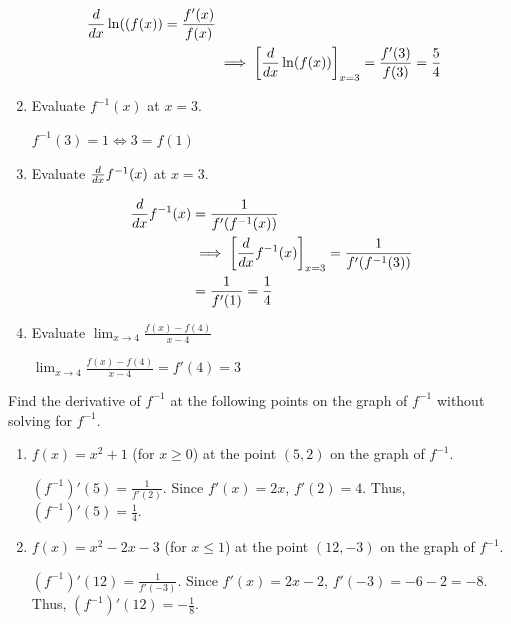 \documentclass[nooutcomes]{ximera}
\begin{document}
\begin{problem}
\begin{enumerate}
\begin{freeResponse}
        \begin{align*}
          \frac{d}{dx}\ln((f(x)) = \frac{f'(x)}{f(x)} \\
          &\implies \bigg[ \frac{d}{dx} \ln(f(x)) \bigg]_{x = 3} = \frac{f'(3)}{f(3)} = \frac{5}{4}
        \end{align*}
      \end{freeResponse}


    \item Evaluate $f^{-1}(x)$ at $x = 3$.
      \begin{freeResponse}
	$ f^{-1}(3) = 1 \iff 3 = f(1)$
      \end{freeResponse}


    \item Evaluate $\frac{d}{dx} f^{-1}(x)$ at $x = 3$.
      \begin{freeResponse}
        \begin{align*}
          \frac{d}{dx} f^{-1}(x) &= \frac{1}{f'(f^{-1}(x))} \\
          &\implies \bigg[ \frac{d}{dx} f^{-1}(x) \bigg]_{x = 3} = \frac{1}{f'(f^{-1}(3))} \\
          &= \frac{1}{f'(1)} = \frac{1}{4}
        \end{align*}
      \end{freeResponse}
      
      \item Evaluate $\lim_{x \to 4} \frac{f(x)-f(4)}{x-4}$
      \begin{freeResponse}
$\lim_{x \to 4} \frac{f(x)-f(4)}{x-4} = f'(4)=3$
      \end{freeResponse}
  \end{enumerate}
\end{problem}


\begin{problem}
Find the derivative of $f^{-1}$ at the following points on the graph of $f^{-1}$  without solving for $f^{-1}$.
	\begin{enumerate}
	
	\item  $f(x) = x^2 + 1$ (for $x \geq 0$) at the point $(5,2)$ on the graph of $f^{-1}$.  
		\begin{freeResponse}
		$(f^{-1})'(5) = \frac{1}{f'(2)}$.  Since $f'(x) = 2x$, $f'(2) = 4$.  Thus, $(f^{-1})'(5) = \frac{1}{4}$.  
		\end{freeResponse}

	\item  $f(x) = x^2 - 2x - 3$ (for $x \leq 1$) at the point $(12, -3)$ on the graph of $f^{-1}$. 
		\begin{freeResponse}
		$(f^{-1})'(12) = \frac{1}{f'(-3)}$.  Since $f'(x) = 2x - 2$, $f'(-3) = -6 - 2 = -8$.  Thus, $(f^{-1})'(12) = - \frac{1}{8}$. 
		\end{freeResponse}
	\end{enumerate}
\end{problem}
\end{document}
